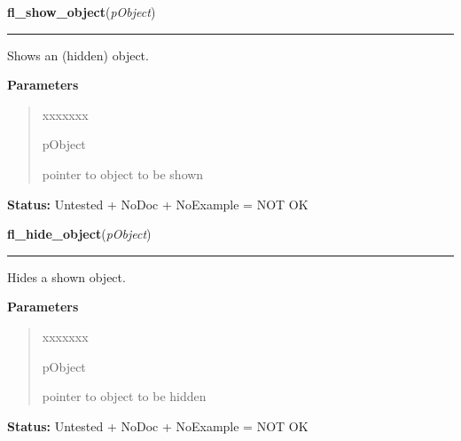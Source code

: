 \hspace{.8\funcindent}\begin{boxedminipage}{\funcwidth}

    \raggedright \textbf{fl\_show\_object}(\textit{pObject})

    \vspace{-1.5ex}

    \rule{\textwidth}{0.5\fboxrule}
\setlength{\parskip}{2ex}
    Shows an (hidden) object.

\setlength{\parskip}{1ex}
      \textbf{Parameters}
      \vspace{-1ex}

      \begin{quote}
        \begin{Ventry}{xxxxxxx}

          \item[pObject]

          pointer to object to be shown

        \end{Ventry}

      \end{quote}

\textbf{Status:} Untested + NoDoc + NoExample = NOT OK



    \end{boxedminipage}

    \label{xformslib:library:fl_hide_object}

    \vspace{0.5ex}

\hspace{.8\funcindent}\begin{boxedminipage}{\funcwidth}

    \raggedright \textbf{fl\_hide\_object}(\textit{pObject})

    \vspace{-1.5ex}

    \rule{\textwidth}{0.5\fboxrule}
\setlength{\parskip}{2ex}
    Hides a shown object.

\setlength{\parskip}{1ex}
      \textbf{Parameters}
      \vspace{-1ex}

      \begin{quote}
        \begin{Ventry}{xxxxxxx}

          \item[pObject]

          pointer to object to be hidden

        \end{Ventry}

      \end{quote}

\textbf{Status:} Untested + NoDoc + NoExample = NOT OK



    \end{boxedminipage}


